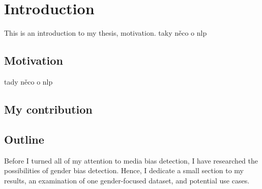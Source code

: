 \chapter{Introduction}
This is an introduction to my thesis, motivation. taky něco o nlp
\section{Motivation}
tady něco o nlp
\section{My contribution}
\section{Outline}
Before I turned all of my attention to media bias detection, I have researched the possibilities of gender bias detection. Hence, I dedicate a small section to my results, an examination of one gender-focused dataset, and potential use cases.

